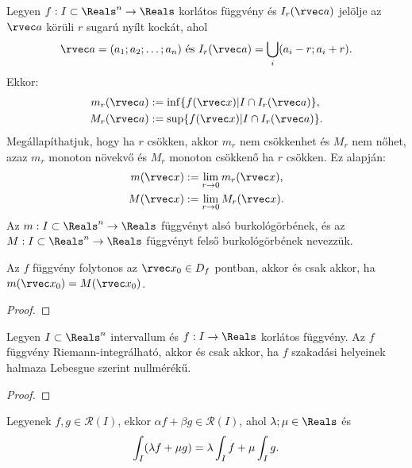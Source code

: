 \begin{definition}
  Legyen $f: I \subset \Reals^n \to \Reals$ korlátos függvény és
  $I_r(\rvec a)$ jelölje az $\rvec a$ körüli $r$ sugarú nyílt kockát, ahol
  $$
    \rvec a = (a_1; a_2; \ldots; a_n)
    \text{ és }
    I_r(\rvec a) = \bigcup_i (a_i - r; a_i + r)
    \text.
  $$
  Ekkor:
  \begin{align*}
    m_r(\rvec a) & := \inf \{ f(\rvec x) | I \cap I_r(\rvec a) \} \text, \\
    M_r(\rvec a) & := \sup \{ f(\rvec x) | I \cap I_r(\rvec a) \} \text.
  \end{align*}
  Megállapíthatjuk, hogy ha $r$ csökken, akkor $m_r$ nem csökkenhet és $M_r$ nem
  nőhet, azaz $m_r$ monoton növekvő és $M_r$ monoton csökkenő ha $r$ csökken. Ez
  alapján:
  \begin{align*}
    m(\rvec x) & := \lim_{r \to 0} m_r(\rvec x) \text, \\
    M(\rvec x) & := \lim_{r \to 0} M_r(\rvec x) \text.
  \end{align*}
  Az $m: I \subset \Reals^n \to \Reals$ függvényt alsó burkológörbének, és az
  $M: I \subset \Reals^n \to \Reals$ függvényt felső burkológörbének nevezzük.
\end{definition}

\begin{statement}
  Az $f$ függvény folytonos az $\rvec x_0 \in D_f$ pontban, akkor és csak akkor,
  ha $m(\rvec x_0) = M(\rvec x_0)$.

  \begin{proof}
    \vspace{8em}
  \end{proof}
\end{statement}

\begin{theorem}
  Legyen $I \subset \Reals^n$ intervallum és $f: I \to \Reals$ korlátos
  függvény. Az $f$ függvény Riemann-integrálható, akkor és csak akkor, ha $f$
  szakadási helyeinek halmaza Lebesgue szerint nullmérékű.

  \begin{proof}
    \vspace{8em}
  \end{proof}
\end{theorem}

\begin{statement}
  Legyenek $f, g \in \mathcal R(I)$, ekkor
  $\alpha f + \beta g \in \mathcal R(I)$, ahol $\lambda; \mu \in \Reals$ és
  $$
    \int_I (\lambda f + \mu g) = \lambda \int_I f + \mu \int_I g
    \text.
  $$
\end{statement}

